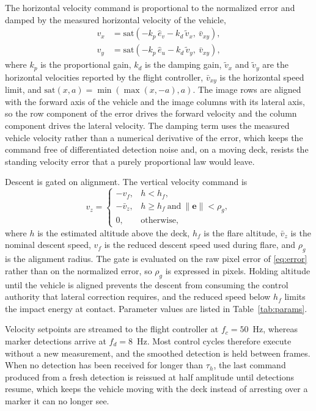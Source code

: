 The horizontal velocity command is proportional to the normalized error and damped by the
measured horizontal velocity of the vehicle,
%
\begin{align}
  v_{x} &= \mathrm{sat}\!\left(-k_{p}\,\hat{e}_{v} - k_{d}\,\tilde{v}_{x},\ \bar{v}_{xy}\right), \label{eq:vx}\\
  v_{y} &= \mathrm{sat}\!\left(-k_{p}\,\hat{e}_{u} - k_{d}\,\tilde{v}_{y},\ \bar{v}_{xy}\right), \label{eq:vy}
\end{align}
%
where $k_{p}$ is the proportional gain, $k_{d}$ is the damping gain,
$\tilde{v}_{x}$ and $\tilde{v}_{y}$ are the horizontal velocities reported by the flight
controller, $\bar{v}_{xy}$ is the horizontal speed limit, and
$\mathrm{sat}(x, a) = \min(\max(x, -a), a)$. The image rows are aligned with the forward
axis of the vehicle and the image columns with its lateral axis, so the row component of
the error drives the forward velocity and the column component drives the lateral velocity.
The damping term uses the measured vehicle velocity rather than a numerical derivative of
the error, which keeps the command free of differentiated detection noise and, on a moving
deck, resists the standing velocity error that a purely proportional law would leave.

Descent is gated on alignment. The vertical velocity command is
%
\begin{equation}
  v_{z} =
  \begin{cases}
    -v_{f}, & h < h_{f},\\
    -\bar{v}_{z}, & h \geq h_{f} \ \text{and}\ \lVert \mathbf{e} \rVert < \rho_{g},\\
    0, & \text{otherwise},
  \end{cases}
  \label{eq:vz}
\end{equation}
%
where $h$ is the estimated altitude above the deck, $h_{f}$ is the flare altitude,
$\bar{v}_{z}$ is the nominal descent speed, $v_{f}$ is the reduced descent speed used
during flare, and $\rho_{g}$ is the alignment radius. The gate is evaluated on the raw
pixel error of \eqref{eq:error} rather than on the normalized error, so $\rho_{g}$ is
expressed in pixels. Holding altitude until the vehicle is aligned prevents the descent
from consuming the control authority that lateral correction requires, and the reduced
speed below $h_{f}$ limits the impact energy at contact. Parameter values are listed in
Table~\ref{tab:params}.

Velocity setpoints are streamed to the flight controller at $f_{c} = 50$~Hz, whereas
marker detections arrive at $f_{d} = 8$~Hz. Most control cycles therefore execute without
a new measurement, and the smoothed detection is held between frames. When no detection
has been received for longer than $\tau_{h}$, the last command produced from a fresh
detection is reissued at half amplitude until detections resume, which keeps the vehicle
moving with the deck instead of arresting over a marker it can no longer see.

